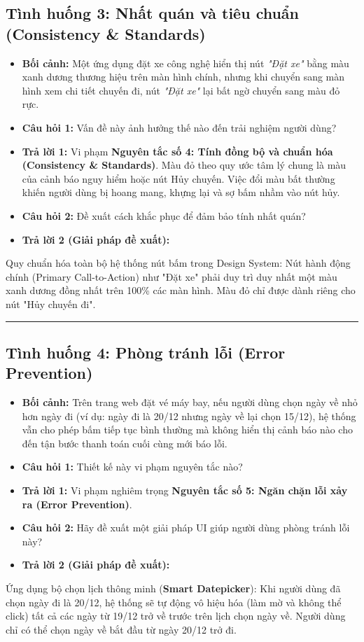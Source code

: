\documentclass[11pt,a4paper,oneside]{report}
\begin{document}
\subsection{Tình huống 3: Nhất quán và tiêu chuẩn (Consistency \& Standards)}
\begin{itemize}[leftmargin=1.5em]
\item \textbf{Bối cảnh:} Một ứng dụng đặt xe công nghệ hiển thị nút \textit{"Đặt xe"} bằng màu xanh dương thương hiệu trên màn hình chính, nhưng khi chuyển sang màn hình xem chi tiết chuyến đi, nút \textit{"Đặt xe"} lại bất ngờ chuyển sang màu đỏ rực.
\item \textbf{Câu hỏi 1:} Vấn đề này ảnh hưởng thế nào đến trải nghiệm người dùng?
\item \textbf{Trả lời 1:} Vi phạm \textbf{Nguyên tắc số 4: Tính đồng bộ và chuẩn hóa (Consistency \& Standards)}. Màu đỏ theo quy ước tâm lý chung là màu của cảnh báo nguy hiểm hoặc nút Hủy chuyến. Việc đổi màu bất thường khiến người dùng bị hoang mang, khựng lại và sợ bấm nhầm vào nút hủy.
\item \textbf{Câu hỏi 2:} Đề xuất cách khắc phục để đảm bảo tính nhất quán?
\item \textbf{Trả lời 2 (Giải pháp đề xuất):}  
\end{itemize}
Quy chuẩn hóa toàn bộ hệ thống nút bấm trong Design System: Nút hành động chính (Primary Call-to-Action) như "Đặt xe" phải duy trì duy nhất một màu xanh dương đồng nhất trên 100\% các màn hình. Màu đỏ chỉ được dành riêng cho nút "Hủy chuyến đi".


\bigskip\hrule\bigskip

\subsection{Tình huống 4: Phòng tránh lỗi (Error Prevention)}
\begin{itemize}[leftmargin=1.5em]
\item \textbf{Bối cảnh:} Trên trang web đặt vé máy bay, nếu người dùng chọn ngày về nhỏ hơn ngày đi (ví dụ: ngày đi là 20/12 nhưng ngày về lại chọn 15/12), hệ thống vẫn cho phép bấm tiếp tục bình thường mà không hiển thị cảnh báo nào cho đến tận bước thanh toán cuối cùng mới báo lỗi.
\item \textbf{Câu hỏi 1:} Thiết kế này vi phạm nguyên tắc nào?
\item \textbf{Trả lời 1:} Vi phạm nghiêm trọng \textbf{Nguyên tắc số 5: Ngăn chặn lỗi xảy ra (Error Prevention)}.
\item \textbf{Câu hỏi 2:} Hãy đề xuất một giải pháp UI giúp người dùng phòng tránh lỗi này?
\item \textbf{Trả lời 2 (Giải pháp đề xuất):}  
\end{itemize}
Ứng dụng bộ chọn lịch thông minh (\textbf{Smart Datepicker}): Khi người dùng đã chọn ngày đi là 20/12, hệ thống sẽ tự động vô hiệu hóa (làm mờ và không thể click) tất cả các ngày từ 19/12 trở về trước trên lịch chọn ngày về. Người dùng chỉ có thể chọn ngày về bắt đầu từ ngày 20/12 trở đi.
\end{document}

